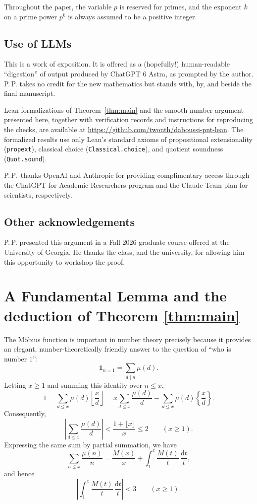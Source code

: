 \documentclass[11pt]{amsart}
\theoremstyle{remark}
\newcommand{\dt}{\,\frac{\mathrm{d}t}{t}}
\begin{document}
Throughout the paper, the variable $p$ is reserved for primes, and the exponent $k$ on a prime power $p^k$ is always assumed to be a positive integer. 

\subsection*{Use of LLMs} This is a work of exposition. It is offered as a (hopefully!) human-readable ``digestion'' of output produced by ChatGPT 6 Astra, as prompted by the author. P.\,P. takes no credit for the new mathematics but stands with, by, and beside the final manuscript.

Lean formalizations of Theorem~\ref{thm:main} and the smooth-number argument presented here, together with verification records and instructions for reproducing the checks, are available at \url{https://github.com/twonth/daboussi-pnt-lean}. The formalized results use only Lean's standard axioms of propositional extensionality (\texttt{propext}), classical choice (\texttt{Classical.choice}), and quotient soundness (\texttt{Quot.sound}).

P.\,P.~thanks OpenAI and Anthropic for providing complimentary access through the ChatGPT for Academic Researchers program and the Claude Team plan for scientists, respectively.

\subsection*{Other acknowledgements} P.\,P. presented this argument in a Fall 2026 graduate course offered at the University of Georgia. He thanks the class, and the university, for allowing him this opportunity to workshop the proof.

\section{A Fundamental Lemma and the deduction of Theorem \ref{thm:main}}\label{sec:fundamental}
The M\"{o}bius function is important in number theory precisely because it provides an elegant, number-theoretically friendly answer to the question of ``who is number $1$'':
\[ \mathbf1_{n=1} = \sum_{d\mid n}\mu(d).\] Letting $x\ge 1$ and summing this identity over $n\le x$,
\[
1=\sum_{d\le x}\mu(d)\left\lfloor\frac xd\right\rfloor
 =x\sum_{d\le x}\frac{\mu(d)}d
  -\sum_{d\le x}\mu(d)\left\{\frac xd\right\}.
\]
Consequently,
\[
\left|\sum_{d\le x}\frac{\mu(d)}d\right|
<\frac{1+\lfloor x\rfloor}{x}\le2\qquad(x\ge1).
\]
Expressing the same sum by partial summation, we have
\[
\sum_{n\le x}\frac{\mu(n)}n
=\frac{M(x)}x+\int_1^x\frac{M(t)}t\dt,
\]
and hence
\begin{equation}\label{eq:signed}
\left|\int_1^x\frac{M(t)}t\dt\right|<3\qquad(x\ge1).
\end{equation}
\end{document}
